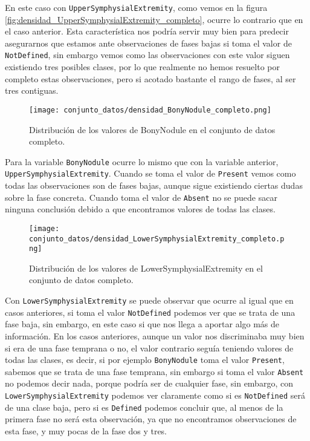 En este caso con \texttt{UpperSymphysialExtremity}, como vemos en la figura \ref{fig:densidad_UpperSymphysialExtremity_completo}, ocurre lo contrario que en el caso anterior. Esta característica nos podría servir muy bien para predecir asegurarnos que estamos ante observaciones de fases bajas si toma el valor de \texttt{NotDefined}, sin embargo vemos como las observaciones con este valor siguen existiendo tres posibles clases, por lo que realmente no hemos resuelto por completo estas observaciones, pero si acotado bastante el rango de fases, al ser tres contiguas.


\begin{figure}[H]
	\centering
	\texttt{[image: conjunto\_datos/densidad\_BonyNodule\_completo.png]}
	\caption{Distribución de los valores de BonyNodule en el conjunto de datos completo.}
	\label{fig:densidad_BonyNodule_completo}
\end{figure}

Para la variable \texttt{BonyNodule} ocurre lo mismo que con la variable anterior, \texttt{UpperSymphysialExtremity}. Cuando se toma el valor de \texttt{Present} vemos como todas las observaciones son de fases bajas, aunque sigue existiendo ciertas dudas sobre la fase concreta. Cuando toma el valor de \texttt{Absent} no se puede sacar ninguna conclusión debido a que encontramos valores de todas las clases.



\begin{figure}[H]
	\centering
	\texttt{[image: conjunto\_datos/densidad\_LowerSymphysialExtremity\_completo.png]}
	\caption{Distribución de los valores de LowerSymphysialExtremity en el conjunto de datos completo.}
	\label{fig:densidad_LowerSymphysialExtremity_completo}
\end{figure}

Con \texttt{LowerSymphysialExtremity} se puede observar que ocurre al igual que en casos anteriores, si toma el valor \texttt{NotDefined} podemos ver que se trata de una fase baja, sin embargo, en este caso si que nos llega a aportar algo más de información. En los casos anteriores, aunque un valor nos discriminaba muy bien si era de una fase temprana o no, el valor contrario seguía teniendo valores de todas las clases, es decir, si por ejemplo \texttt{BonyNodule} toma el valor \texttt{Present}, sabemos que se trata de una fase temprana, sin embargo si toma el valor \texttt{Absent} no podemos decir nada, porque podría ser de cualquier fase, sin embargo, con \texttt{LowerSymphysialExtremity} podemos ver claramente como si es \texttt{NotDefined} será de una clase baja, pero si es \texttt{Defined} podemos concluir que, al menos de la primera fase no será esta observación, ya que no encontramos observaciones de esta fase, y muy pocas de la fase dos y tres.

